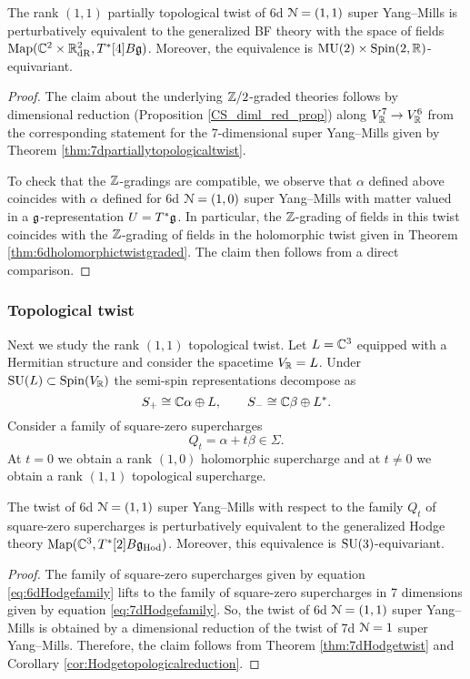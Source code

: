 \documentclass[10pt, oneside]{article}
\newcommand{\Hod}{\mathrm{Hod}}
\newcommand{\MU}{\mathrm{MU}}
\begin{document}
\begin{thm}
The rank $(1, 1)$ partially topological twist of 6d $\mathcal N=(1, 1)$ super Yang--Mills is perturbatively equivalent to the generalized BF theory with the space of fields $\operatorname{Map}(\mathbb C^2\times \mathbb R^2_{\mathrm{dR}}, T^*[4] B\mathfrak g)$. Moreover, the equivalence is $\MU(2)\times\Spin(2, \RR)$-equivariant.
\end{thm}
\begin{proof}
The claim about the underlying $\mathbb Z/2$-graded theories follows by dimensional reduction (Proposition \ref{CS_diml_red_prop}) along $V^7_\mathbb R\rightarrow V^6_\mathbb R$ from the corresponding statement for the 7-dimensional super Yang--Mills given by Theorem \ref{thm:7dpartiallytopologicaltwist}.

To check that the $\mathbb Z$-gradings are compatible, we observe that $\alpha$ defined above coincides with $\alpha$ defined for 6d $\mathcal N=(1, 0)$ super Yang--Mills with matter valued in a $\mathfrak g$-representation $U=T^*\mathfrak g$. In particular, the $\mathbb Z$-grading of fields in this twist coincides with the $\mathbb Z$-grading of fields in the holomorphic twist given in Theorem \ref{thm:6dholomorphictwistgraded}. The claim then follows from a direct comparison.
\end{proof}

\subsubsection{Topological twist}

Next we study the rank $(1, 1)$ topological twist. Let $L=\mathbb C^3$ equipped with a Hermitian structure and consider the spacetime $V_\mathbb R=L$. Under $\mathrm{SU}(L)\subset \mathrm{Spin}(V_\mathbb R)$ the semi-spin representations decompose as
\[
S_+\cong \mathbb C\alpha\oplus L,\qquad S_-\cong \mathbb C\beta\oplus L^*.
\]
Consider a family of square-zero supercharges
\begin{equation}
Q_t = \alpha + t\beta\in \Sigma.
\label{eq:6dHodgefamily}
\end{equation}
At $t=0$ we obtain a rank $(1, 0)$ holomorphic supercharge and at $t\neq 0$ we obtain a rank $(1, 1)$ topological supercharge.

\begin{thm}
The twist of 6d $\mathcal N=(1, 1)$ super Yang--Mills with respect to the family $Q_t$ of square-zero supercharges is perturbatively equivalent to the generalized Hodge theory $\map(\CC^3, T^*[2] B\fg_{\Hod})$. Moreover, this equivalence is $\mathrm{SU}(3)$-equivariant.
\label{thm:6dHodgetwist}
\end{thm}
\begin{proof}
The family of square-zero supercharges given by equation \eqref{eq:6dHodgefamily} lifts to the family of square-zero supercharges in 7 dimensions given by equation \eqref{eq:7dHodgefamily}. So, the twist of 6d $\mathcal N=(1, 1)$ super Yang--Mills is obtained by a dimensional reduction of the twist of 7d $\mathcal N=1$ super Yang--Mills. Therefore, the claim follows from Theorem \ref{thm:7dHodgetwist} and Corollary \ref{cor:Hodgetopologicalreduction}.
\end{proof}
\end{document}
